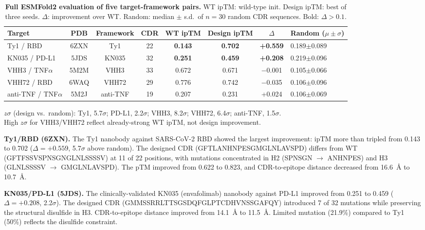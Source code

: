 \documentclass[11pt,a4paper]{article}
\begin{document}
\begin{table}[H]
\centering
\caption{\textbf{Full ESMFold2 evaluation of five target-framework pairs.} WT ipTM: wild-type init. Design ipTM: best of three seeds. $\Delta$: improvement over WT. Random: median $\pm$ s.d.\ of $n=30$ random CDR sequences. Bold: $\Delta > 0.1$.}
\label{tab:results}
\begin{tabular}{@{}lccccccl@{}}
\toprule
Target & PDB & Framework & CDR & WT ipTM & Design ipTM & $\Delta$ & Random ($\mu\pm\sigma$) \\
\midrule
Ty1 / RBD        & 6ZXN & Ty1     & 22 & \textbf{0.143} & \textbf{0.702} & \textbf{+0.559} & 0.189$\pm$0.089 \\
KN035 / PD-L1    & 5JDS & KN035   & 32 & \textbf{0.251} & \textbf{0.459} & \textbf{+0.208} & 0.219$\pm$0.096 \\
VHH3 / TNF$\alpha$ & 5M2M & VHH3  & 33 & 0.672 & 0.671 & $-$0.001 & 0.105$\pm$0.066 \\
VHH72 / RBD      & 6WAQ & VHH72   & 29 & 0.776 & 0.742 & $-$0.035 & 0.106$\pm$0.096 \\
anti-TNF / TNF$\alpha$ & 5M2J & anti-TNF & 19 & 0.207 & 0.231 & +0.024 & 0.106$\pm$0.069 \\
\bottomrule
\end{tabular}
\vspace{4pt}
\footnotesize{$z\sigma$ (design vs.\ random): Ty1, 5.7$\sigma$; PD-L1, 2.2$\sigma$; VHH3, 8.2$\sigma$; VHH72, 6.4$\sigma$; anti-TNF, 1.5$\sigma$.\\
High $z\sigma$ for VHH3/VHH72 reflect already-strong WT ipTM, not design improvement.}
\end{table}

\textbf{Ty1/RBD (6ZXN).} The Ty1 nanobody\cite{hanke2020} against SARS-CoV-2 RBD showed the largest improvement: ipTM more than tripled from \num{0.143} to \num{0.702} ($\Delta = +0.559$, 5.7$\sigma$ above random). The designed CDR (GFTLANHNPESGMGLNLAVSPD) differs from WT (GFTFSSVSPNSGNGLNLSSSSV) at 11 of 22 positions, with mutations concentrated in H2 (SPNSGN $\to$ ANHNPES) and H3 (GLNLSSSSV $\to$ GMGLNLAVSPD). The pTM improved from \num{0.622} to \num{0.823}, and CDR-to-epitope distance decreased from \SI{16.6}{\AA} to \SI{10.7}{\AA}.

\textbf{KN035/PD-L1 (5JDS).} The clinically-validated KN035 (envafolimab) nanobody\cite{zhang2019} against PD-L1 improved from \num{0.251} to \num{0.459} ($\Delta = +0.208$, 2.2$\sigma$). The designed CDR (GMMSSRRLTTSGSDQFGLPTCDHVNSSGAFQY) introduced 7 of 32 mutations while preserving the structural disulfide in H3. CDR-to-epitope distance improved from \SI{14.1}{\AA} to \SI{11.5}{\AA}. Limited mutation (21.9\%) compared to Ty1 (50\%) reflects the disulfide constraint.
\end{document}

